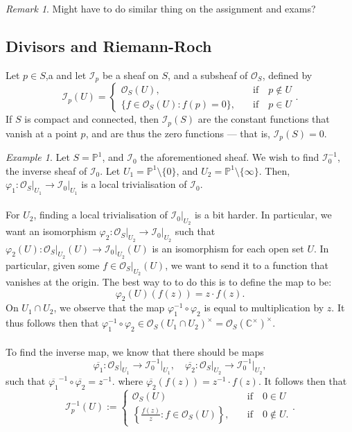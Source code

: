 \documentclass[a4paper]{report}
\theoremstyle{definition}
\theoremstyle{remark}
\newtheorem{remark}{Remark}
\theoremstyle{proposition}
\theoremstyle{conjecture}
\theoremstyle{lemma}
\theoremstyle{corollary}
\theoremstyle{exercise}
\theoremstyle{example}
\newtheorem{example}{Example}
\newcommand{\C}{\mathbb{C}}
\newcommand{\mcal}{\mathcal}
\begin{document}
\begin{remark}
    Might have to do similar thing on the assignment and exams?
\end{remark}

\subsection{Divisors and Riemann-Roch}

Let $p\in S$,a and let $\mcal{I}_p$ be a sheaf on $S$, and a 
subsheaf of $\mcal{O}_S$, defined by 
$$\mcal{I}_p(U) = \begin{cases}
    \mcal{O}_S(U), \quad &\text{if}\quad p\not\in U\\
    \lbrace f\in \mcal{O}_S(U) : f(p) = 0 \rbrace, \quad &\text{if}\quad p\in U
\end{cases}.$$
If $S$ is compact and connected, then $\mcal{I}_p(S)$ are the constant 
functions that vanish at a point $p$, and are thus the zero functions 
--- that is, $\mcal{I}_p(S) = 0$.

\begin{example}
    Let $S = \mathbb{P}^1$, and $\mcal{I}_0$ the aforementioned sheaf.
    We wish to find $\mcal{I}_0^{-1}$, the inverse sheaf of $\mcal{I}_0$.
    Let $U_1 = \mathbb{P}^1\setminus \lbrace 0 \rbrace$, and 
    $U_2 = \mathbb{P}^1\setminus \lbrace \infty\rbrace$.
    Then, $\varphi_1 :\mcal{O}_S\vert_{U_1}  \to \mcal{I}_0\vert_{U_1}$
    is a local trivialisation of $\mcal{I}_0$.\\\\
    For $U_2$, finding a local trivialisation of $\mcal{I}_0\vert_{U_2}$
    is a bit harder. In particular, we want an isomorphism 
    $\varphi_2 : \mcal{O}_S\vert_{U_2} \to \mcal{I}_0\vert_{U_2}$ 
    such that $\varphi_2(U) : \mcal{O}_S\vert_{U_2}(U) \to \mcal{I}_0\vert_{U_2}(U)$
    is an isomorphism for each open set $U$. In particular, given some 
    $f \in \mcal{O}_S\vert_{U_2}(U)$, we want to send it to a function that 
    vanishes at the origin. The best way to to do this is to define the map
    to be:
    $$\varphi_2(U)(f(z)) = z\cdot f(z).$$
    On $U_1\cap U_2$, we observe that the map $\varphi_1^{-1}\circ \varphi_2$
    is equal to multiplication by $z$.
    It thus follows then that 
    $\varphi_1^{-1}\circ \varphi_2 \in \mcal{O}_S(U_1\cap U_2)^\times = \mcal{O}_S(\C^\times)^\times$.\\\\
    To find the inverse map, we know that there should be maps 
    $$\overline{\varphi_1} : \mcal{O}_S\vert_{U_1} \longrightarrow \mcal{I}_0^{-1}\vert_{U_1},\quad 
    \overline{\varphi_2} : \mcal{O}_S\vert_{U_2} \longrightarrow \mcal{I}_0^{-1}\vert_{U_2},$$
    such that $\overline{\varphi_1}^{-1}\circ \overline{\varphi_2} = z^{-1}$.
    where $\overline{\varphi_2}(f(z)) = z^{-1}\cdot f(z)$.
    It follows then that 
    $$\mcal{I}_p^{-1}(U) := \begin{cases}
        \mcal{O}_S(U) \quad &\text{if}\quad 0\in U\\
        \left\lbrace \frac{f(z)}{z} : f\in\mcal{O}_S(U)\right\rbrace,\quad &\text{if}\quad 0\not\in U.
    \end{cases}.$$
\end{example}
\end{document}

